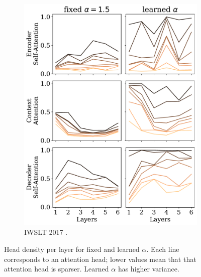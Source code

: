 \begin{figure}[!htbp]
\begin{subfigure}[b]{.49\linewidth}
        \includegraphics[width=\linewidth]{Figures/head_density_per_layer_de.pdf}
        \caption{%
            \label{fig:head_density_per_layer_de}%
            IWSLT 2017 .}
    \end{subfigure}
    \caption{%
        \label{fig:head_density_per_layer}
        Head density per layer for fixed and learned $\alpha$. Each line
        corresponds to an attention head; lower values mean that that
        attention head is sparser. Learned $\alpha$ has higher variance.
    }
\end{figure}

